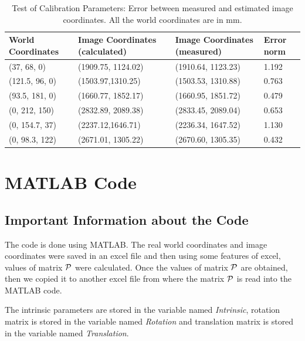 \documentclass{article}
\begin{document}
\begin{center}
\begin{table}
\centering
\begin{tabular}{ l | p{2.8cm} | p{2.8cm} | l}
World Coordinates & Image Coordinates (calculated) & Image Coordinates (measured) & Error norm \\ \hline \hline
(37, 68, 0) & (1909.75, 1124.02) & (1910.64, 1123.23) & 1.192 \\
(121.5, 96, 0)  & (1503.97,1310.25) & (1503.53, 1310.88) & 0.763 \\
(93.5, 181, 0) & (1660.77, 1852.17) & (1660.95, 1851.72) & 0.479\\
(0, 212, 150) & (2832.89, 2089.38) & (2833.45, 2089.04) & 0.653\\
(0, 154.7, 37) & (2237.12,1646.71) & (2236.34, 1647.52) & 1.130\\ 
(0, 98.3, 122) & (2671.01, 1305.22)& (2670.60, 1305.35) & 0.432\\ \hline
\end{tabular}
\smallskip
\caption{Test of Calibration Parameters: Error between measured and estimated image coordinates. All the world coordinates are in mm.}
\end{table}
\end{center}



\section{MATLAB Code}

\subsection{Important Information about the Code}
The code is done using MATLAB. The real world coordinates and image coordinates were saved in an excel file and then using some features of excel, values of matrix $\CMcal{P}$ were calculated. Once the values of matrix $\CMcal{P}$ are obtained, then we copied it to another excel file from where the matrix $\CMcal{P}$ is read into the MATLAB code. 

\medskip

The intrinsic parameters are stored in the variable named \textit{Intrinsic}, rotation matrix is stored in the variable named \textit{Rotation} and translation matrix is stored in the variable named \textit{Translation}. 
\end{document}
